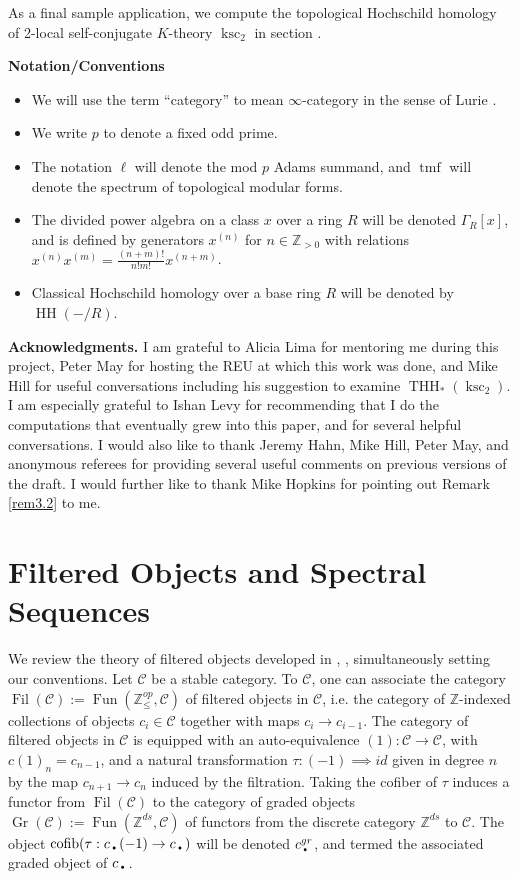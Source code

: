 \documentclass[11pt,leqno]{article}
\newcommand{\zz}{\mathbb{Z}}
\newcommand{\mc}[1]{\mathcal{#1}}
\DeclareMathOperator{\THH}{THH}
\DeclareMathOperator{\tmf}{tmf}
\DeclareMathOperator{\cofib}{cofib}
\DeclareMathOperator{\ksc}{ksc}
\newcommand{\mo}[1]{\operatorname{#1}}
\newcommand{\f}[2]{\frac{#1}{#2}}
\newcommand{\bdot}{\text{\textbullet}}
\newtheorem*{short hand}{theorem name}
\theoremstyle{plain}  %
\theoremstyle{definition}
\numberwithin{equation}{section}
\begin{document}
As a final sample application, we compute the topological Hochschild homology of 2-local self-conjugate $K$-theory $\ksc_2$ in section .

\noindent\textbf{Notation/Conventions}
\begin{itemize}
	\item We will use the term ``category'' to mean $\infty$-category in the sense of Lurie \cite{lurie2008higher}. 
	\item We write $p$ to denote a fixed odd prime.
	\item The notation $\ell$ will denote the mod $p$ Adams summand, and $\tmf$ will denote the spectrum of topological modular forms.
	\item The divided power algebra on a class $x$ over a ring $R$ will be denoted $\Gamma_{R}[x]$, and is defined by generators $x^{(n)}$ for $n\in\zz_{> 0}$ with relations $x^{(n)}x^{(m)}=\f{(n+m)!}{n!m!}x^{(n+m)}$.
	\item Classical Hochschild homology over a base ring $R$ will be denoted by $\mo{HH}(-/R)$.
\end{itemize}
\noindent\textbf{Acknowledgments.}  I am grateful to Alicia Lima for mentoring me during this project, Peter May for hosting the REU at which this work was done, and Mike Hill for useful conversations including his suggestion to examine $\THH_*(\ksc_2)$.  I am especially grateful to Ishan Levy for recommending that I do the computations that eventually grew into this paper, and for several helpful conversations.  I would also like to thank Jeremy Hahn, Mike Hill, Peter May, and anonymous referees for providing several useful comments on previous versions of the draft.  I would further like to thank Mike Hopkins for pointing out Remark \ref{rem3.2} to me.
		\newpage
\section{Filtered Objects and Spectral Sequences}
\indent We review the theory of filtered objects developed in \cite[~.2]{HA}, \cite[~\textsection Appendix B]{burklund2022galois}, simultaneously setting our conventions.  Let $\mc{C}$ be a stable category.  To $\mc{C}$, one can associate the category $\mo{Fil}(\mc{C}):=\mo{Fun}(\zz_{\leq }^{op},\mc{C})$ of filtered objects in $\mc{C}$, i.e. the category of $\zz$-indexed collections of objects $c_i\in\mc{C}$ together with maps $c_i\to c_{i-1}$.  The category of filtered objects in $\mc{C}$ is equipped with an auto-equivalence $(1):\mc{C}\to \mc{C}$, with $c(1)_{n}=c_{n-1}$, and a natural transformation $\tau:(-1)\implies id$ given in degree $n$ by the map $c_{n+1}\to c_n$ induced by the filtration.  Taking the cofiber of $\tau$ induces a functor from $\mo{Fil}(\mc{C})$ to the category of graded objects $\mo{Gr}(\mc{C}):=\mo{Fun}(\zz^{ds},\mc{C})$ of functors from the discrete category $\zz^{ds}$ to $\mc{C}$.  The object $\cofib(\tau:c_{\bdot}(-1)\to c_{\bdot})$ will be denoted $c_{\bdot}^{gr}$, and termed the associated graded object of $c_{\bdot}$.
\end{document}

